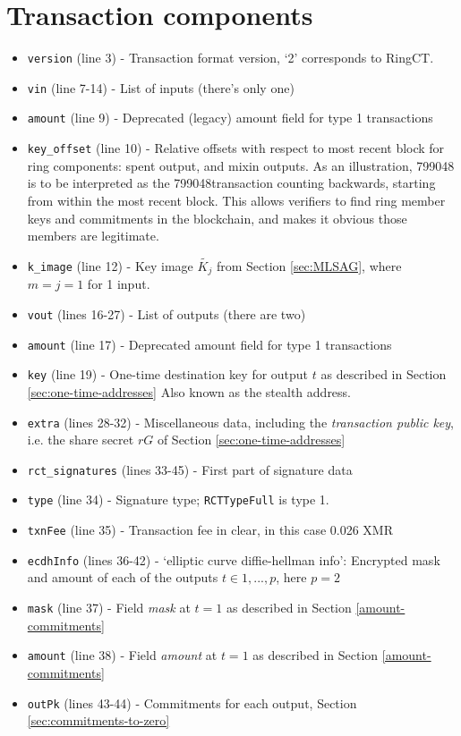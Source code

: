 \begin{appendices}
\begin{Verbatim}[commandchars=\\\{\}, numbers=left]
\end{Verbatim}

\section*{Transaction components}
	
\begin{itemize}
	\item {\tt version} (line 3) - Transaction format version, `2' corresponds to RingCT.
	\item {\tt vin} (line 7-14) - List of inputs (there’s only one)
	\item {\tt amount} (line 9) - Deprecated (legacy) amount field for type 1 transactions
	\item {\tt key\_offset} (line 10) - Relative offsets with respect to most recent block for ring components: spent output, and mixin outputs. As an illustration, 799048 is to be interpreted as the 799048\nth transaction counting backwards, starting from within the most recent block. This allows verifiers to find ring member keys and commitments in the blockchain, and makes it obvious those members are legitimate.
	\item {\tt k\_image} (line 12) - Key image \(\tilde{K_j}\) from Section \ref{sec:MLSAG}, where $m = j = 1$ for 1 input.
	\item {\tt vout} (lines 16-27) - List of outputs (there are two)
	\item {\tt amount} (line 17) - Deprecated amount field for type 1 transactions
	\item {\tt key} (line 19) - One-time destination key for output $t$ as described in Section \ref{sec:one-time-addresses} Also known as the stealth address.
	\item {\tt extra} (lines 28-32) - Miscellaneous data, including the {\em transaction public key}, i.e. the share secret $r G$ of Section  \ref{sec:one-time-addresses}
	\item {\tt rct\_signatures} (lines 33-45) - First part of signature data
	\item {\tt type} (line 34) - Signature type; {\tt RCTTypeFull} is type 1.
	\item {\tt txnFee} (line 35) - Transaction fee in clear, in this case 0.026 XMR
	\item {\tt ecdhInfo} (lines 36-42) - ‘elliptic curve diffie-hellman info’: Encrypted mask and amount of each of the outputs $t \in {1, ..., p}$, here $p = 2$
	\item {\tt mask} (line 37) - Field {\sl mask} at $t = 1$ as described in Section \ref{amount-commitments}
    \item {\tt amount} (line 38) - Field {\sl amount} at $t = 1$ as described in Section \ref{amount-commitments}
    \item {\tt outPk} (lines 43-44) - Commitments for each output, Section \ref{sec:commitments-to-zero}
    

\end{itemize}
\end{appendices}
